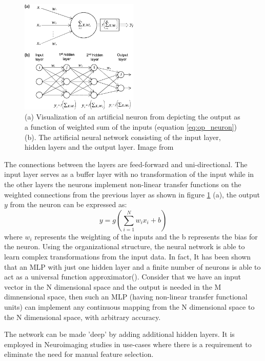 \documentclass[msthesis.tex]{subfiles}
\begin{document}
\begin{figure}
    \centering
    \includegraphics[width=0.5\textwidth]{images/tnn_ann.png}
    \caption{(a) Visualization of an artificial neuron from \cite{vieira2017using} depicting the output as a function of weighted sum of the inputs (equation \ref{eq:op_neuron}) (b). The artificial neural network consisting of the input layer, hidden layers and the output layer. Image from \cite{article}}
    \label{fig:mlp}
\end{figure}
The connections between the layers are feed-forward and uni-directional. The input layer serves as a buffer layer with no transformation of the input while in the other layers the neurons implement non-linear transfer functions on the weighted connections from the previous layer as shown in figure \ref{fig:mlp} (a), the output $y$ from the neuron can be expressed as:
\begin{equation}
    \label{eq:op_neuron}
    y = g(\sum_{i=1}^{N} w_i x_i +b) 
\end{equation}
where $w_i$ represents the weighting of the inputs and the b represents the bias for the neuron. Using the organizational structure, the neural network is able to learn complex transformations from the input data. In fact, It has been shown that an MLP with just one hidden layer and a finite number of neurons is able to act as a universal function approximator(\cite{universal_mlp}). Consider that we have an input vector in the N dimensional space and the output is needed in the M dimnensional space, then such an MLP (having non-linear transfer functional units) can implement any continuous mapping from the N dimensional space to the N dimensional space, with arbitrary accuracy. 

The network can be made 'deep' by adding additional hidden layers. It is employed in Neuroimaging studies in use-cases where there is a requirement to eliminate the need for manual feature selection.
\end{document}
